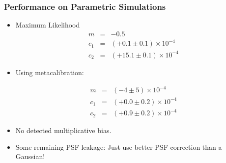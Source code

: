 \documentclass{beamer}
\newcommand{\mcal}{metacalibration}
\begin{document}
\frame
{
    \frametitle{Performance on Parametric Simulations}

 
    \begin{itemize}


        \item Maximum Likelihood 
            {\color{brightred} 
                \begin{eqnarray}
                    m & = & -0.5  \nonumber \\
                  c_1 & = & (+0.1 \pm 0.1) \times 10^{-4} \nonumber \\
                  c_2 & = & (+15.1 \pm 0.1) \times 10^{-4} \nonumber
                \end{eqnarray}
            }


        \item Using \mcal:

            {\color{green} 
                \begin{eqnarray}
                    m & = & (-4 \pm 5) \times 10^{-4} \nonumber \\
                  c_1 & = & (+0.0 \pm 0.2) \times 10^{-4} \nonumber \\
                  c_2 & = & (+0.9 \pm 0.2) \times 10^{-4} \nonumber
                \end{eqnarray}
            }


        \item No detected multiplicative bias.
        \item Some remaining PSF leakage: Just use
            better PSF correction than a Gaussian!

    \end{itemize}

}
\end{document}
